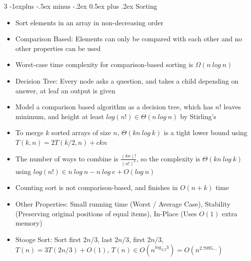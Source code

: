 \documentclass[10pt, landscape]{article}
\makeatletter
\renewcommand{\section}{\@startsection{section}{1}{0mm}%
                                {-1ex plus -.5ex minus -.2ex}%
                                {0.5ex plus .2ex}%
                                {\normalfont\large\bfseries}}
\renewcommand{\section}{\@startsection{section}{2}{0mm}%
                                {-1explus -.5ex minus -.2ex}%
                                {0.5ex plus .2ex}%
                                {\normalfont\normalsize\bfseries}}
\makeatother
\begin{document}
\begin{multicols*}{3}
\section{Sorting}
\begin{itemize}
    \item Sort elements in an array in non-decreasing order
    \item Comparison Based: Elements can only be compared with each other and no other properties can be used
    \item Worst-case time complexity for comparison-based sorting is $\Omega(n\ log\ n)$
    \item Decision Tree: Every node asks a question, and takes a child depending on answer, at leaf an output is given
    \item Model a comparison based algorithm as a decision tree, which has $n!$ leaves minimum, and height at least $log(n!)\in \Theta(n\ log \ n)$ by Stirling's
    \item To merge $k$ sorted arrays of size $n$, $\Theta(kn\ log\ k)$ is a tight lower bound using $T(k,n)=2T(k/2, n) +ckn$
    \item The number of ways to combine is $\frac{(kn)!}{(n!)^k}$, so the complexity is $\Theta(kn\ log\ k)$ using $log(n!) \in n\ log\ n - n\ log\ e+ O(log\ n)$
    \item Counting sort is not comparison-based, and finishes in $O(n+k)$ time
    \item Other Properties: Small running time (Worst / Average Case), Stability (Preserving original positions of equal items), In-Place (Uses $O(1)$ extra memory) 
    \item Stooge Sort: Sort first $2n/3$, last $2n/3$, first $2n/3$, $T(n)=3T(2n/3)+O(1)$, $T(n) \in O(n^{log_{3/2}3})=O(n^{2.7095...})$
\end{itemize}


\end{multicols*}
\end{document}
